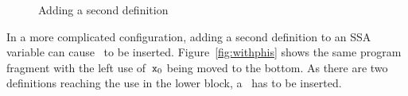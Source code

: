\begin{figure}[htbp]
	\centering
	\hfill
	\hfill
	\label{fig:ex1}
	\caption{Adding a second definition}
\end{figure}

In a more complicated configuration, adding a second definition to an SSA variable can cause \phiops\ to be inserted.
Figure~\ref{fig:withphis} shows the same program fragment with the left use of~$\mathtt{x}_0$ being moved to the bottom.
As there are two definitions reaching the use in the lower block, a \phiop\ has to be inserted. 

